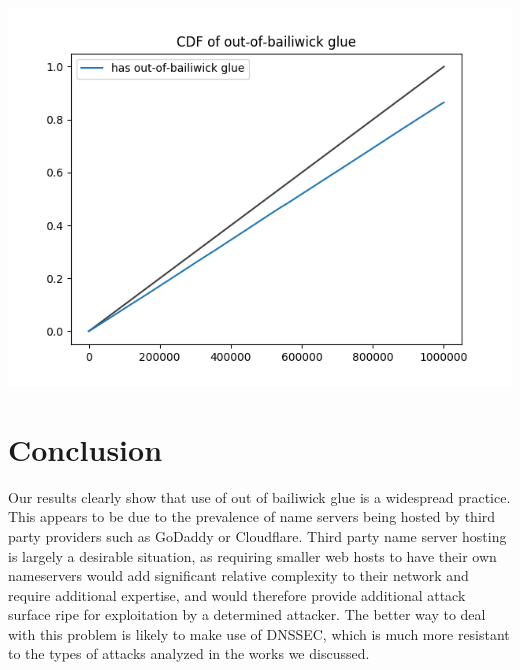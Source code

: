 \documentclass{idc_msc}
\begin{document}


\includegraphics[width=15cm]{cdf.png}



\section{Conclusion}
Our results clearly show that use of out of bailiwick glue is a widespread practice. This appears to be due to the prevalence of name servers being hosted by third party providers such as GoDaddy or Cloudflare. Third party name server hosting is largely a desirable situation, as requiring smaller web hosts to have their own nameservers would add significant relative complexity to their network and require additional expertise, and would therefore provide additional attack surface ripe for exploitation by a determined attacker. The better way to deal with this problem is likely to make use of DNSSEC, which is much more resistant to the types of attacks analyzed in the works we discussed.
\end{document}
